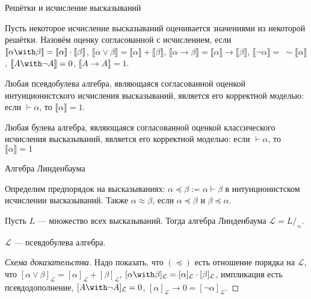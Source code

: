 \documentclass[aspectratio=169]{beamer}
\begin{document}
\begin{frame}{Решётки и исчисление высказываний}
\begin{defrus}Пусть некоторое исчисление высказываний оценивается значениями из некоторой решётки.
Назовём оценку согласованной с исчислением, если 
$\llbracket\alpha\with\beta\rrbracket = \llbracket\alpha\rrbracket\cdot\llbracket\beta\rrbracket$,
$\llbracket\alpha\vee\beta\rrbracket = \llbracket\alpha\rrbracket+\llbracket\beta\rrbracket$,
$\llbracket\alpha\rightarrow\beta\rrbracket = \llbracket\alpha\rrbracket\rightarrow\llbracket\beta\rrbracket$,
$\llbracket\neg\alpha\rrbracket =\ \sim\llbracket\alpha\rrbracket$,
$\llbracket A \with\neg A\rrbracket = 0$, $\llbracket A\rightarrow A \rrbracket = 1$.
\end{defrus}

\begin{thmrus}Любая псевдобулева алгебра, являющаяся согласованной оценкой интуиционистского исчисления высказываний,
является его корректной моделью: если $\vdash\alpha$, то $\llbracket\alpha\rrbracket = 1$.
\end{thmrus}

\begin{thmrus}Любая булева алгебра, являющаяся согласованной оценкой классического исчисления высказываний, 
является его корректной моделью: если $\vdash\alpha$, то $\llbracket\alpha\rrbracket = 1$
\end{thmrus}

\end{frame}

\begin{frame}{Алгебра Линденбаума}
\begin{defrus}Определим предпорядок на высказываниях: $\alpha \preceq \beta := \alpha \vdash \beta$ в интуиционистском исчислении высказываний.
Также $\alpha\approx\beta$, если $\alpha\preceq\beta$ и $\beta\preceq\alpha$.\end{defrus}
\begin{defrus}Пусть $L$ --- множество всех высказываний. Тогда алгебра Линденбаума $\mathcal{L} = L/_\approx$.\end{defrus}
\begin{thmrus}$\mathcal{L}$ --- псевдобулева алгебра.\end{thmrus}
\begin{proof}[Схема доказательства] Надо показать, что $(\preceq)$ есть отношение порядка на $\mathcal{L}$, что
$[\alpha\vee\beta]_\mathcal{L} = [\alpha]_\mathcal{L}+[\beta]_\mathcal{L}$, 
$[\alpha\with\beta]_\mathcal{L} = [\alpha]_\mathcal{L}\cdot[\beta]_\mathcal{L}$, импликация есть псевдодополнение,
$[A\with\neg A]_\mathcal{L} = 0$, $[\alpha]_\mathcal{L}\rightarrow 0 = [\neg\alpha]_\mathcal{L}$.\end{proof}
\end{frame}
\end{document}
